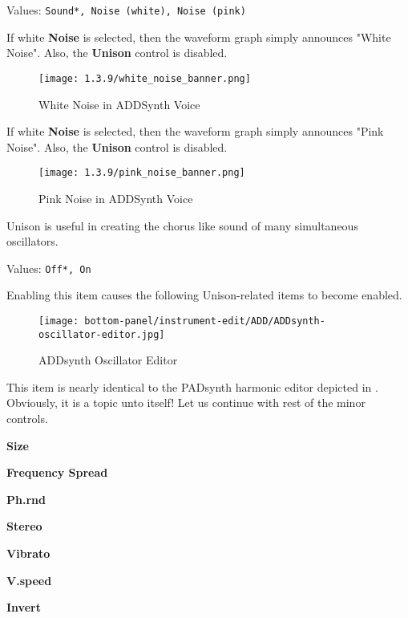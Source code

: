    Values: \texttt{Sound*, Noise (white), Noise (pink)}

   If white \textbf{Noise} is selected, then the waveform graph simply announces
   "White Noise".  Also, the \textbf{Unison} control is
   disabled.

\begin{figure}[H]
   \centering 
   \texttt{[image: 1.3.9/white\_noise\_banner.png]}
   \caption{White Noise in ADDSynth Voice}
   \label{fig:voice_oscillator_white_noise}
\end{figure}

   If white \textbf{Noise} is selected, then the waveform graph simply announces
   "Pink Noise".  Also, the \textbf{Unison} control is
   disabled.

\begin{figure}[H]
   \centering 
   \texttt{[image: 1.3.9/pink\_noise\_banner.png]}
   \caption{Pink Noise in ADDSynth Voice}
   \label{fig:voice_oscillator_pink_noise}
\end{figure}

   Unison is useful in creating the chorus like sound of many simultaneous
   oscillators.

   Values: \texttt{Off*, On}

   Enabling this item causes the following Unison-related items to become
   enabled.

\begin{figure}[H]
   \centering 
   \texttt{[image: bottom-panel/instrument-edit/ADD/ADDsynth-oscillator-editor.jpg]}
   \caption{ADDsynth Oscillator Editor}
   \label{fig:addsynth_oscillator_editor}
\end{figure}

   This item is nearly identical to the PADsynth harmonic editor depicted in
   .
   Obviously, it is a topic unto itself!
   Let us continue with rest of the minor controls.

      \begin{enumber}
         \item \textbf{Size}
         \item \textbf{Frequency Spread}
         \item \textbf{Ph.rnd}
         \item \textbf{Stereo}
         \item \textbf{Vibrato}
         \item \textbf{V.speed}
         \item \textbf{Invert}
      \end{enumber}

